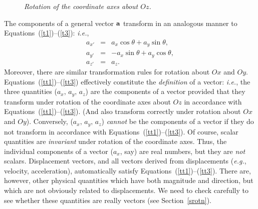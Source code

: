 \begin{figure}
\epsfysize=1.75in
\centerline{}
\caption{\em Rotation of the coordinate axes about $Oz$.}\label{f3}
\end{figure}

The 
components of a general vector ${\bf a}$  transform in an analogous
manner to Equations~(\ref{t1})--(\ref{t3}): {\em i.e.}, 
\begin{eqnarray}
a_{x'} &=& a_x\cos\theta + a_y\sin \theta,\label{tt1}\\[0.5ex]
a_{y'} &=& -a_x\sin\theta + a_y\cos\theta,\\[0.5ex]
a_{z'} &=& a_z.\label{tt3}
\end{eqnarray}
Moreover, there are similar transformation rules for rotation about $Ox$ and $Oy$.
Equations~(\ref{tt1})--(\ref{tt3}) effectively constitute the {\em definition}\/ of a vector: {\em i.e.}, 
 the three
quantities ($a_x,\, a_y,\, a_z$) are the components of a vector provided that
they transform under rotation of the coordinate axes about $Oz$ in accordance with Equations~(\ref{tt1})--(\ref{tt3}). (And also transform
correctly under rotation about $Ox$ and $Oy$).
Conversely, ($a_x,\, a_y,\, a_z$) {\em cannot}\/ be the components of a vector if they
do not transform in accordance with Equations~(\ref{tt1})--(\ref{tt3}). Of course, scalar quantities are {\em invariant}\/
 under rotation of the coordinate axes.
Thus, the individual components of a vector ($a_x$, say) are real numbers, but 
they are
{\em not}\/ scalars.
Displacement vectors, and all vectors derived from
displacements ({\em e.g.}, velocity, acceleration), automatically satisfy Equations~(\ref{tt1})--(\ref{tt3}). There are, however, other
physical quantities which have both magnitude and direction, but which are not
obviously related to displacements. We need to check carefully to see whether these
quantities are really vectors (see Section~\ref{srotn}). 

